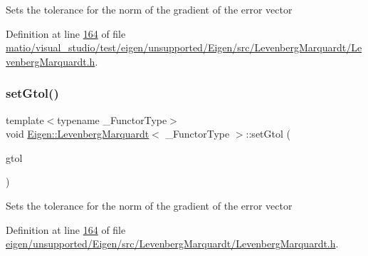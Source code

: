 Sets the tolerance for the norm of the gradient of the error vector 

Definition at line \hyperlink{matio_2visual__studio_2test_2eigen_2unsupported_2_eigen_2src_2_levenberg_marquardt_2_levenberg_marquardt_8h_source_l00164}{164} of file \hyperlink{matio_2visual__studio_2test_2eigen_2unsupported_2_eigen_2src_2_levenberg_marquardt_2_levenberg_marquardt_8h_source}{matio/visual\+\_\+studio/test/eigen/unsupported/\+Eigen/src/\+Levenberg\+Marquardt/\+Levenberg\+Marquardt.\+h}.

\mbox{\label{class_eigen_1_1_levenberg_marquardt_ad5610b2353f1ce5e0c7357ed1b215fea}} 
\subsubsection{\texorpdfstring{set\+Gtol()}{setGtol()}\hspace{0.1cm}{\footnotesize\ttfamily [2/2]}}
{\footnotesize\ttfamily template$<$typename \+\_\+\+Functor\+Type$>$ \\
void \hyperlink{class_eigen_1_1_levenberg_marquardt}{Eigen\+::\+Levenberg\+Marquardt}$<$ \+\_\+\+Functor\+Type $>$\+::set\+Gtol (\begin{DoxyParamCaption}\item[{Real\+Scalar}]{gtol }\end{DoxyParamCaption})\hspace{0.3cm}{\ttfamily [inline]}}

Sets the tolerance for the norm of the gradient of the error vector 

Definition at line \hyperlink{eigen_2unsupported_2_eigen_2src_2_levenberg_marquardt_2_levenberg_marquardt_8h_source_l00164}{164} of file \hyperlink{eigen_2unsupported_2_eigen_2src_2_levenberg_marquardt_2_levenberg_marquardt_8h_source}{eigen/unsupported/\+Eigen/src/\+Levenberg\+Marquardt/\+Levenberg\+Marquardt.\+h}.

\mbox{\label{class_eigen_1_1_levenberg_marquardt_af072d0f89c44415d8ed284df8b4a634a}} 
